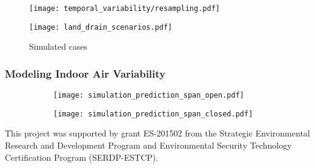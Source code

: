 \documentclass[journal=esthag,manuscript=article]{achemso}
\begin{document}
\begin{figure}[!h]
	\centering
	\begin{minipage}[c]{0.49\textwidth}
		\centering
    \caption{ }
    \label{fig:resampling}
    \texttt{[image: temporal\_variability/resampling.pdf]}
	\end{minipage}
	\begin{minipage}[c]{0.49\textwidth}
		\centering
    \caption{Simulated cases}
    \label{fig:land_drain_scenarios}
    \texttt{[image: land\_drain\_scenarios.pdf]}
	\end{minipage}
\end{figure}



\subsubsection{Modeling Indoor Air Variability}

\begin{figure}[htb!]
  \caption{ }
  \label{fig:simulation_sampling}
  \begin{subfigure}{0.49\textwidth}
    \centering
    \caption{ }
    \label{fig:simulation_sampling_pp_open}
    \texttt{[image: simulation\_prediction\_span\_open.pdf]}
  \end{subfigure}
  \begin{subfigure}{0.49\textwidth}
    \centering
    \caption{ }
    \label{fig:simulation_sampling_pp_closed}
    \texttt{[image: simulation\_prediction\_span\_closed.pdf]}
  \end{subfigure}
\end{figure}


\begin{acknowledgement}
  This project was supported by grant ES-201502 from the Strategic Environmental Research and Development Program and Environmental Security Technology Certification Program (SERDP-ESTCP).
\end{acknowledgement}


\end{document}
